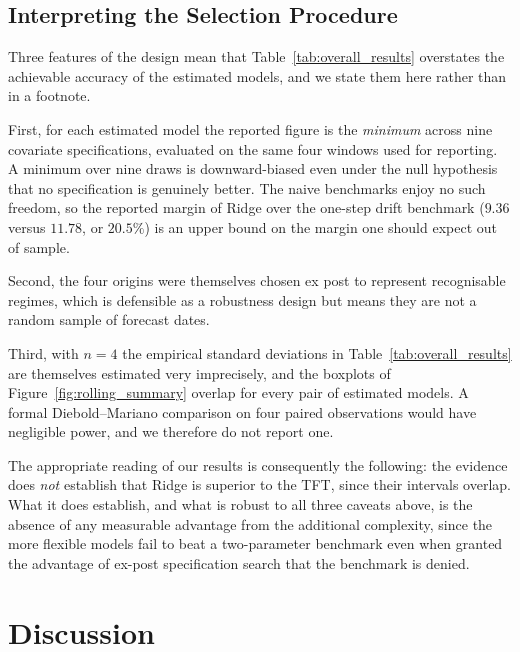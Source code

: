 \documentclass[11pt,a4paper]{article}
\begin{document}
\subsection{Interpreting the Selection Procedure}
\label{subsec:selection}

Three features of the design mean that Table~\ref{tab:overall_results}
overstates the achievable accuracy of the estimated models, and we state them
here rather than in a footnote.

First, for each estimated model the reported figure is the \emph{minimum}
across nine covariate specifications, evaluated on the same four windows used
for reporting. A minimum over nine draws is downward-biased even under the
null hypothesis that no specification is genuinely better. The naive
benchmarks enjoy no such freedom, so the reported margin of Ridge over the
one-step drift benchmark ($9.36$ versus $11.78$, or $20.5\%$) is an upper
bound on the margin one should expect out of sample.

Second, the four origins were themselves chosen ex post to represent
recognisable regimes, which is defensible as a robustness design but means
they are not a random sample of forecast dates.

Third, with $n=4$ the empirical standard deviations in
Table~\ref{tab:overall_results} are themselves estimated very imprecisely, and
the boxplots of Figure~\ref{fig:rolling_summary} overlap for every pair of
estimated models. A formal Diebold--Mariano comparison on four paired
observations would have negligible power, and we therefore do not report one.

The appropriate reading of our results is consequently the following: the
evidence does \emph{not} establish that Ridge is superior to the TFT, since
their intervals overlap. What it does establish, and what is robust to all
three caveats above, is the absence of any measurable advantage from the
additional complexity, since the more flexible models fail to beat a
two-parameter benchmark even when granted the advantage of ex-post
specification search that the benchmark is denied.

\section{Discussion}
\label{sec:discussion}
\end{document}
